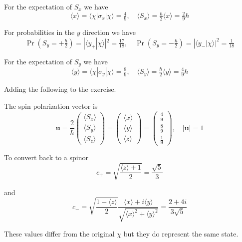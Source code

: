 For the expectation of $S_x$ we have
\begin{equation*}
\langle x\rangle=\langle\chi|\sigma_x|\chi\rangle=\tfrac{4}{9},\quad
\langle S_x\rangle=\tfrac{\hbar}{2}\langle x\rangle=\tfrac{2}{9}\hbar
\end{equation*}

For probabilities in the $y$ direction we have
\begin{equation*}
\Pr\left(S_y=+\tfrac{\hbar}{2}\right)=|\langle y_+|\chi\rangle|^2=\tfrac{17}{18},\quad
\Pr\left(S_y=-\tfrac{\hbar}{2}\right)=|\langle y_-|\chi\rangle|^2=\tfrac{1}{18}
\end{equation*}

For the expectation of $S_y$ we have
\begin{equation*}
\langle y\rangle=\langle\chi|\sigma_y|\chi\rangle=\tfrac{8}{9},\quad
\langle S_y\rangle=\tfrac{\hbar}{2}\langle y\rangle=\tfrac{4}{9}\hbar
\end{equation*}

Adding the following to the exercise.

\bigskip
The spin polarization vector is
\begin{equation*}
\mathbf u=\frac{2}{\hbar}
\begin{pmatrix}
\langle S_x\rangle
\\[1ex]
\langle S_y\rangle
\\[1ex]
\langle S_z\rangle
\end{pmatrix}
=
\begin{pmatrix}
\langle x\rangle
\\[1ex]
\langle y\rangle
\\[1ex]
\langle z\rangle
\end{pmatrix}
=
\begin{pmatrix}
\frac{4}{9}
\\[1ex]
\frac{8}{9}
\\[1ex]
\frac{1}{9}
\end{pmatrix},\quad|\mathbf u|=1
\end{equation*}

To convert back to a spinor
\begin{equation*}
c_+=\sqrt{\frac{\langle z\rangle+1}{2}}=\frac{\sqrt5}{3}
\end{equation*}

and
\begin{equation*}
c_-=\sqrt{\frac{1-\langle z\rangle}{2}}
\frac{\langle x\rangle+i\langle y\rangle}{\sqrt{\langle x\rangle^2+\langle y\rangle^2}}
=\frac{2+4i}{3\sqrt5}
\end{equation*}

These values differ from the original $\chi$ but they do represent the same state.


